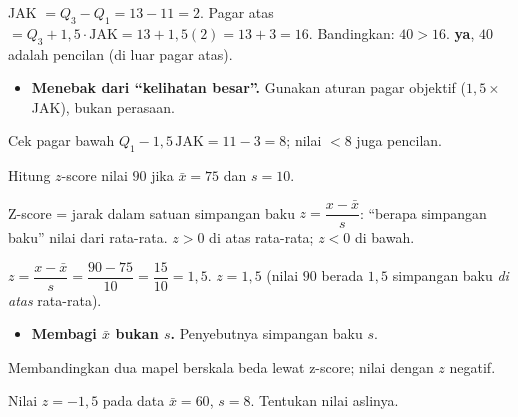 \jawab
{} JAK $=Q_3-Q_1=13-11=2$.
 Pagar atas $=Q_3+1{,}5\cdot\text{JAK}=13+1{,}5(2)=13+3=16$.
 Bandingkan: $40>16$.
\jadi \textbf{ya}, $40$ adalah pencilan (di luar pagar atas).

\begin{jebakan}
\begin{itemize}[leftmargin=*,topsep=2pt]
  \item \textbf{Menebak dari ``kelihatan besar''.} Gunakan aturan pagar objektif
  ($1{,}5\times$ JAK), bukan perasaan.
\end{itemize}
\end{jebakan}

\begin{variasi}
Cek pagar bawah $Q_1-1{,}5\,\text{JAK}=11-3=8$; nilai $<8$ juga pencilan.
\end{variasi}

\begin{soalbox}{}
Hitung $z$-score nilai $90$ jika $\bar x=75$ dan $s=10$.
\end{soalbox}

\begin{ingat}{Z-score = jarak dalam satuan simpangan baku}
$z=\dfrac{x-\bar x}{s}$: ``berapa simpangan baku'' nilai dari rata-rata.
$z>0$ di atas rata-rata; $z<0$ di bawah.
\end{ingat}

\jawab
{} $z=\dfrac{x-\bar x}{s}=\dfrac{90-75}{10}=\dfrac{15}{10}=1{,}5$.
\jadi $z=1{,}5$ (nilai $90$ berada $1{,}5$ simpangan baku \emph{di atas}
rata-rata).

\begin{jebakan}
\begin{itemize}[leftmargin=*,topsep=2pt]
  \item \textbf{Membagi $\bar x$ bukan $s$.} Penyebutnya simpangan baku $s$.
\end{itemize}
\end{jebakan}

\begin{variasi}
Membandingkan dua mapel berskala beda lewat z-score; nilai dengan $z$ negatif.
\end{variasi}

\begin{soalbox}{}
Nilai $z=-1{,}5$ pada data $\bar x=60$, $s=8$. Tentukan nilai aslinya.
\end{soalbox}

